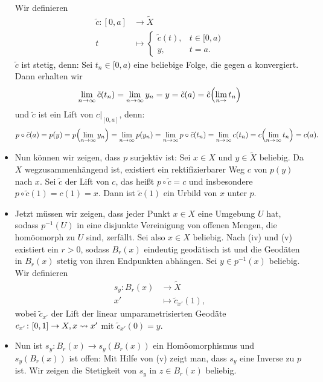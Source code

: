 \begin{beweis}
\begin{itemize}
		Wir definieren
		\begin{align*}
			\tilde{c}\colon [0,a] &\longrightarrow \tilde{X} \\
			t &\longmapsto \begin{cases}
				\tilde{c}(t), & t \in [0,a) \\
				y, & t = a.
			\end{cases}
		\end{align*}
		$\tilde{c}$ ist stetig, denn:
		Sei $t_n \in [0,a)$ eine beliebige Folge, die gegen $a$ konvergiert.
		Dann erhalten wir
		\[
			\lim\limits_{n \rightarrow \infty} \tilde{c}(t_n) = \lim\limits_{n \rightarrow \infty} y_n = y = \tilde{c}(a) = \tilde{c}\enbrace*{\lim\limits_{n \rightarrow} t_n}
		\]
		und $\tilde{c}$ ist ein Lift von $c \big|_{[0,a]}$, denn:
		\[
			p \circ \tilde{c}(a) = p(y) = p \enbrace*{\lim\limits_{n \rightarrow \infty} y_n} = \lim\limits_{n \rightarrow \infty} p(y_n) = \lim\limits_{n \rightarrow \infty} p \circ \tilde{c}(t_n) = \lim\limits_{n \rightarrow \infty} c(t_n) = c \enbrace*{\lim\limits_{n \rightarrow \infty} t_n} = c(a).
		\]
		\item Nun können wir zeigen, dass $p$ surjektiv ist:
		Sei $x \in X$ und $y \in \tilde{X}$ beliebig.
		Da $X$ wegzusammenhängend ist, existiert ein rektifizierbarer Weg $c$ von $p(y)$ nach $x$.
		Sei $\tilde{c}$ der Lift von $c$, das heißt $p \circ \tilde{c} = c$ und insbesondere $p \circ \tilde{c}(1) = c(1) = x$.
		Dann ist $\tilde{c}(1)$ ein Urbild von $x$ unter $p$.
		\item Jetzt müssen wir zeigen, dass jeder Punkt $x \in X$ eine Umgebung $U$ hat, sodass $p^{-1}(U)$ in eine disjunkte Vereinigung von offenen Mengen, die homöomorph zu $U$ sind, zerfällt.
		Sei also $x \in X$ beliebig.
		Nach (iv) und (v) existiert ein $r > 0$, sodass $B_r(x)$ eindeutig geodätisch ist und die Geodäten in $B_r(x)$ stetig von ihren Endpunkten abhängen.
		Sei $y \in p^{-1}(x)$ beliebig.
		Wir definieren
		\begin{align*}
			s_y \colon B_r(x) &\longrightarrow \tilde{X} \\
			x' &\longmapsto \tilde{c}_{x'}(1),
		\end{align*}
		wobei $\tilde{c}_{x'}$ der Lift der linear umparametrisierten Geodäte $c_{x'} \colon [0,1] \rightarrow X, x \rightsquigarrow x'$ mit $\tilde{c}_{x'}(0) = y$.
		\item Nun ist $s_y \colon B_r(x) \rightarrow s_y(B_r(x))$ ein Homöomorphismus und $s_y(B_r(x))$ ist offen:
		Mit Hilfe von (v) zeigt man, dass $s_y$ eine Inverse zu $p$ ist.
		Wir zeigen die Stetigkeit von $s_y$ in $z \in B_r(x)$ beliebig.

\end{itemize}
\end{beweis}
